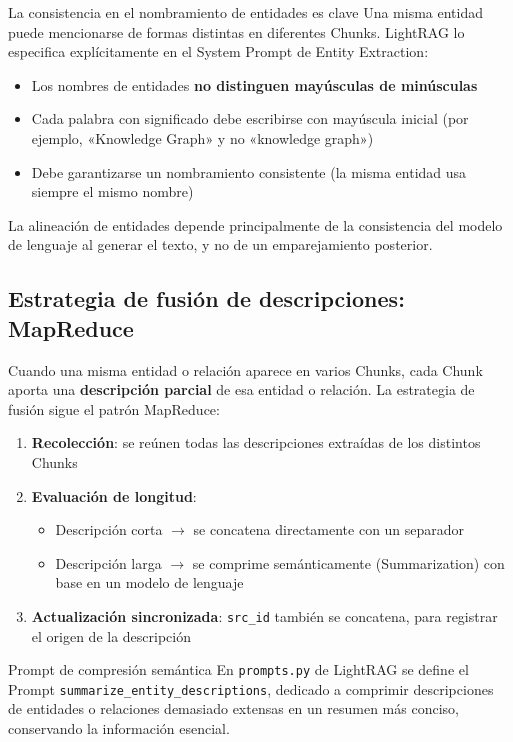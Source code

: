 \documentclass[a4paper]{article}
\begin{document}
\begin{warningbox}{La consistencia en el nombramiento de entidades es clave}
Una misma entidad puede mencionarse de formas distintas en diferentes Chunks. LightRAG lo especifica explícitamente en el System Prompt de Entity Extraction:
\begin{itemize}
    \item Los nombres de entidades \textbf{no distinguen mayúsculas de minúsculas}
    \item Cada palabra con significado debe escribirse con mayúscula inicial (por ejemplo, «Knowledge Graph» y no «knowledge graph»)
    \item Debe garantizarse un nombramiento consistente (la misma entidad usa siempre el mismo nombre)
\end{itemize}
La alineación de entidades depende principalmente de la consistencia del modelo de lenguaje al generar el texto, y no de un emparejamiento posterior.
\end{warningbox}

\subsection{Estrategia de fusión de descripciones: MapReduce}

Cuando una misma entidad o relación aparece en varios Chunks, cada Chunk aporta una \textbf{descripción parcial} de esa entidad o relación. La estrategia de fusión sigue el patrón MapReduce:

\begin{enumerate}
    \item \textbf{Recolección}: se reúnen todas las descripciones extraídas de los distintos Chunks
    \item \textbf{Evaluación de longitud}:
    \begin{itemize}
        \item Descripción corta $\rightarrow$ se concatena directamente con un separador
        \item Descripción larga $\rightarrow$ se comprime semánticamente (Summarization) con base en un modelo de lenguaje
    \end{itemize}
    \item \textbf{Actualización sincronizada}: \texttt{src\_id} también se concatena, para registrar el origen de la descripción
\end{enumerate}

\begin{importantbox}{Prompt de compresión semántica}
En \texttt{prompts.py} de LightRAG se define el Prompt \texttt{summarize\_entity\_descriptions}, dedicado a comprimir descripciones de entidades o relaciones demasiado extensas en un resumen más conciso, conservando la información esencial.
\end{importantbox}
\end{document}

